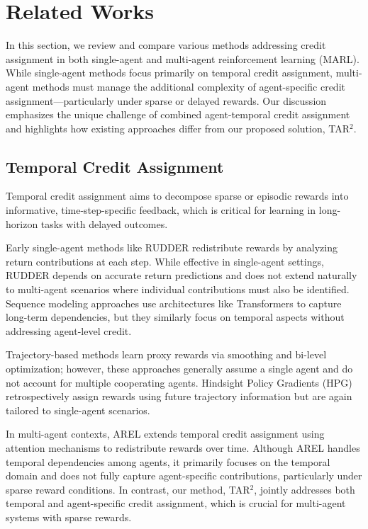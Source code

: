 \section{Related Works}
\label{sec:related-works}

In this section, we review and compare various methods addressing credit assignment in both single-agent and multi-agent reinforcement learning (MARL). While single-agent methods focus primarily on temporal credit assignment, multi-agent methods must manage the additional complexity of agent-specific credit assignment—particularly under sparse or delayed rewards. Our discussion emphasizes the unique challenge of combined agent-temporal credit assignment and highlights how existing approaches differ from our proposed solution, TAR\(^{2}\).

\subsection{Temporal Credit Assignment}
\label{subsec:temporal-credit-assignment}

Temporal credit assignment aims to decompose sparse or episodic rewards into informative, time-step-specific feedback, which is critical for learning in long-horizon tasks with delayed outcomes.

Early single-agent methods like RUDDER \citep{arjona2019rudder} redistribute rewards by analyzing return contributions at each step. While effective in single-agent settings, RUDDER depends on accurate return predictions and does not extend naturally to multi-agent scenarios where individual contributions must also be identified. Sequence modeling approaches \citep{liu2019sequence, han2022off} use architectures like Transformers \citep{vaswani2017attention} to capture long-term dependencies, but they similarly focus on temporal aspects without addressing agent-level credit.

Trajectory-based methods \citep{ren2021learning, zhu2023towards} learn proxy rewards via smoothing and bi-level optimization; however, these approaches generally assume a single agent and do not account for multiple cooperating agents. Hindsight Policy Gradients (HPG) \citep{harutyunyan2019hindsight} retrospectively assign rewards using future trajectory information but are again tailored to single-agent scenarios.

In multi-agent contexts, AREL \citep{xiao2022agent} extends temporal credit assignment using attention mechanisms to redistribute rewards over time. Although AREL handles temporal dependencies among agents, it primarily focuses on the temporal domain and does not fully capture agent-specific contributions, particularly under sparse reward conditions. In contrast, our method, TAR\(^{2}\), jointly addresses both temporal and agent-specific credit assignment, which is crucial for multi-agent systems with sparse rewards.

